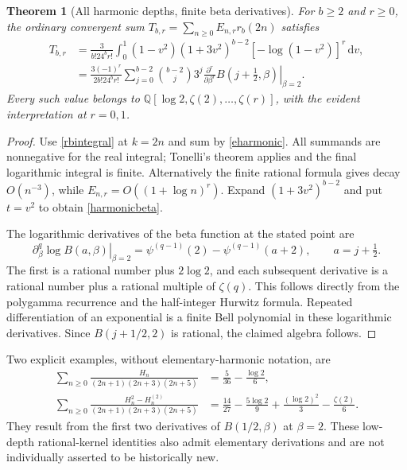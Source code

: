 \documentclass[11pt]{article}
\numberwithin{equation}{section}
\newtheorem{theorem}{Theorem}[section]
\theoremstyle{definition}\newtheorem{definition}[theorem]{Definition}
\theoremstyle{remark}\newtheorem{remark}[theorem]{Remark}
\newcommand{\Q}{\mathbb Q}\newcommand{\C}{\mathbb C}\newcommand{\Ncal}{\mathcal N}\newcommand{\Acal}{\mathcal A}\newcommand{\dd}{\,\mathrm d}
\begin{document}
\begin{theorem}[All harmonic depths, finite beta derivatives]\label{harmonics}
For $b\ge2$ and $r\ge0$, the ordinary convergent sum
$T_{b,r}=\sum_{n\ge0}E_{n,r}r_b(2n)$ satisfies
\begin{align}
 T_{b,r}&=\frac3{b!24^b r!}\int_0^1
 (1-v^2)(1+3v^2)^{b-2}[-\log(1-v^2)]^r\dd v,\label{harmonicint}\\
 &=\frac{3(-1)^r}{2b!24^b r!}
 \sum_{j=0}^{b-2}\binom{b-2}{j}3^j
 \left.\frac{\partial^r}{\partial\beta^r}
 B(j+\tfrac12,\beta)\right|_{\beta=2}.\label{harmonicbeta}
\end{align}
Every such value belongs to
$\Q[\log2,\zeta(2),\ldots,\zeta(r)]$, with the evident interpretation at $r=0,1$.
\end{theorem}
\begin{proof}
Use \eqref{rbintegral} at $k=2n$ and sum by \eqref{eharmonic}. All summands are nonnegative for the real integral; Tonelli's theorem applies and the final logarithmic integral is finite. Alternatively the finite rational formula gives decay $O(n^{-3})$, while $E_{n,r}=O((1+\log n)^r)$. Expand $(1+3v^2)^{b-2}$ and put $t=v^2$ to obtain \eqref{harmonicbeta}.

The logarithmic derivatives of the beta function at the stated point are
\[
 \left.\partial_\beta^q\log B(a,\beta)\right|_{\beta=2}
 =\psi^{(q-1)}(2)-\psi^{(q-1)}(a+2),\qquad a=j+\tfrac12.
\]
The first is a rational number plus $2\log2$, and each subsequent derivative is a rational number plus a rational multiple of $\zeta(q)$. This follows directly from the polygamma recurrence and the half-integer Hurwitz formula. Repeated differentiation of an exponential is a finite Bell polynomial in these logarithmic derivatives. Since $B(j+1/2,2)$ is rational, the claimed algebra follows.
\end{proof}
Two explicit examples, without elementary-harmonic notation, are
\begin{align}
 \sum_{n\ge0}\frac{H_n}{(2n+1)(2n+3)(2n+5)}
 &=\frac5{36}-\frac{\log2}{6},\label{hexample1}\\
 \sum_{n\ge0}\frac{H_n^2-H_n^{(2)}}{(2n+1)(2n+3)(2n+5)}
 &=\frac{14}{27}-\frac{5\log2}{9}
   +\frac{(\log2)^2}{3}-\frac{\zeta(2)}6.\label{hexample2}
\end{align}
They result from the first two derivatives of $B(1/2,\beta)$ at $\beta=2$. These low-depth rational-kernel identities also admit elementary derivations and are not individually asserted to be historically new.
\end{document}
